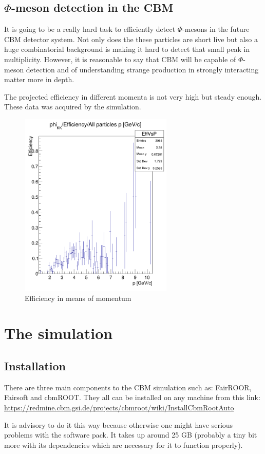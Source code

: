 \documentclass[a4paper,12pt]{article}
\begin{document}
\subsection{$\Phi$-meson detection in the CBM}
\vspace{5mm}
\par It is going to be a really hard task to efficiently detect $\Phi$-mesons in the future CBM detector system. Not only does the these particles are short live but also a huge combinatorial background is making it hard to detect that small peak in multiplicity. However, it is reasonable to say that CBM will be capable of $\Phi$-meson detection and of understanding strange production in strongly interacting matter more in depth.
\vspace{5mm}
\par The projected efficiency in different momenta is not very high but steady enough. These data was acquired by the simulation. 
\begin{figure}[H]
	\centering
	\includegraphics[width=0.65\textwidth]{efficieny.png}
	\caption{ Efficiency in means of momentum }
\end{figure}
\section{ The simulation}
\vspace{3mm}
\subsection{ Installation}
\vspace{5mm}
\par There are three main components to the CBM simulation such as: FairROOR, Fairsoft and cbmROOT. They all can be installed on any machine from this link:
\url{https://redmine.cbm.gsi.de/projects/cbmroot/wiki/InstallCbmRootAuto} \newline
\par It is advisory to do it this way because otherwise one might have serious problems with the software pack. It takes up around 25 GB (probably a tiny bit more with its dependencies which are necessary for it to function properly).
\end{document}
